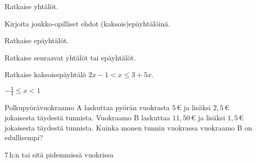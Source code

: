 \begin{multicols}{2}

\begin{tehtava} 
Ratkaise yhtälöt.
    \begin{vastaus}
    \end{vastaus}
\end{tehtava}

\begin{tehtava} 
Kirjoita joukko-opilliset ehdot (kaksois)epäyhtälöinä.
		\alakohdatm{
		§ $x \in [2,7]$
		§ $y \in ]-3,0]$
		§ $z \in ]-\infty, 5[$?
		}
    \begin{vastaus}
    \end{vastaus}
\end{tehtava}

\begin{tehtava} 
Ratkaise epäyhtälöt.
    \begin{vastaus}
    \end{vastaus}
\end{tehtava}

\begin{tehtava}
    Ratkaise seuraavat yhtälöt tai epäyhtälöt.
    \begin{vastaus}
    \end{vastaus}
\end{tehtava}

\begin{tehtava}
Ratkaise kaksoisepäyhtälö $2x-1 < x \leq 3+5x$.
    \begin{vastaus}
        $-\frac{3}{4} \leq x < 1$
    \end{vastaus}
\end{tehtava}

\begin{tehtava}
Polkupyörävuokraamo A laskuttaa pyörän vuokrasta $5$\,€ ja lisäksi $2,5$\,€ jokaisesta täydestä tunnista. Vuokraamo B laskuttaa $11,50$\,€ ja lisäksi $1,5$\,€ jokaisesta täydestä tunnista. Kuinka monen tunnin vuokrassa vuokraamo B on edullisempi?
    \begin{vastaus}
	$7$\,h:n tai sitä pidemmissä vuokrissa
    \end{vastaus}
\end{tehtava}


\end{multicols}
